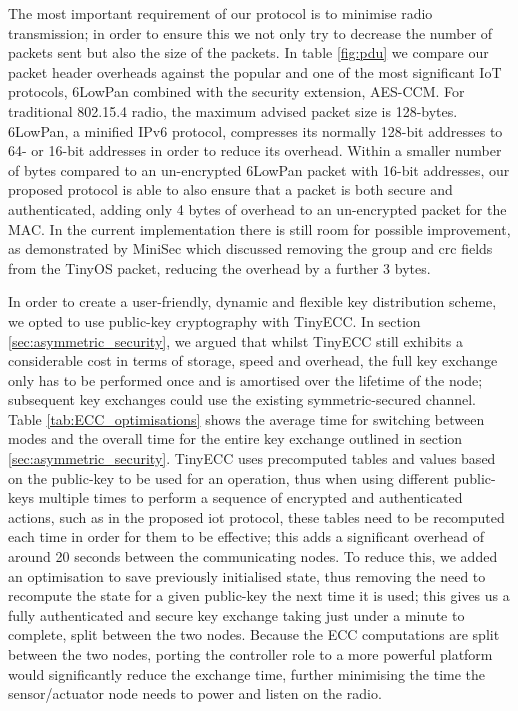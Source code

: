 \documentclass[conference]{./sty/IEEEtran}
\begin{document}
The most important requirement of our protocol is to minimise radio transmission; in order to ensure this we not only try to decrease the number of packets sent but also the size of the packets. In table \ref{fig:pdu} we compare our packet header overheads against the popular and one of the most significant IoT protocols, 6LowPan combined with the security extension, AES-CCM. For traditional 802.15.4 radio, the maximum advised packet size is 128-bytes. 6LowPan, a minified IPv6 protocol, compresses its normally 128-bit addresses to 64- or 16-bit addresses in order to reduce its overhead. Within a smaller number of bytes compared to an un-encrypted 6LowPan packet with 16-bit addresses, our proposed protocol is able to also ensure that a packet is both secure and authenticated, adding only 4 bytes of overhead to an un-encrypted packet for the MAC. In the current implementation there is still room for possible improvement, as demonstrated by MiniSec which discussed removing the group and crc fields from the TinyOS packet, reducing the overhead by a further 3 bytes.

In order to create a user-friendly, dynamic and flexible key distribution scheme, we opted to use public-key cryptography with TinyECC. In section \ref{sec:asymmetric_security}, we argued that whilst TinyECC still exhibits a considerable cost in terms of storage, speed and overhead, the full key exchange only has to be performed once and is amortised over the lifetime of the node; subsequent key exchanges could use the existing symmetric-secured channel. Table \ref{tab:ECC_optimisations} shows the average time for switching between modes and the overall time for the entire key exchange outlined in section \ref{sec:asymmetric_security}. TinyECC uses precomputed tables and values based on the public-key to be used for an operation, thus when using different public-keys multiple times to perform a sequence of encrypted and authenticated actions, such as in the proposed iot protocol, these tables need to be recomputed each time in order for them to be effective; this adds a significant overhead of around 20 seconds between the communicating nodes. To reduce this, we added an optimisation to save previously initialised state, thus removing the need to recompute the state for a given public-key the next time it is used; this gives us a fully authenticated and secure key exchange taking just under a minute to complete, split between the two nodes. Because the ECC computations are split between the two nodes, porting the controller role to a more powerful platform would significantly reduce the exchange time, further minimising the time the sensor/actuator node needs to power and listen on the radio. 
\end{document}

